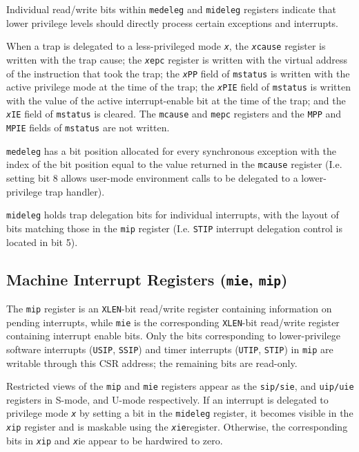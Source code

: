 Individual read/write bits within \texttt{medeleg} and \texttt{mideleg} registers indicate
that lower privilege levels should directly process certain exceptions
and interrupts.

When a trap is delegated to a less-privileged mode \texttt{\emph{x}}, the
\texttt{\emph{x}cause} register is written with the trap cause; the \texttt{\emph{x}epc}
register is written with the virtual address of the instruction that
took the trap; the \texttt{\emph{x}PP} field of \texttt{mstatus} is written with the
active privilege mode at the time of the trap; the \texttt{\emph{x}PIE} field of
\texttt{mstatus} is written with the value of the active interrupt-enable bit at
the time of the trap; and the \texttt{\emph{x}IE} field of \texttt{mstatus} is cleared.
The \texttt{mcause} and \texttt{mepc} registers and the \texttt{MPP} and \texttt{MPIE} fields of \texttt{mstatus} are not written.



\texttt{medeleg} has a bit position allocated for every synchronous exception with the index of the bit position equal to the
value returned in the \texttt{mcause} register (I.e. setting bit 8 allows
user-mode environment calls to be delegated to a lower-privilege trap
handler). 



\texttt{mideleg} holds trap delegation bits for individual interrupts, with the
layout of bits matching those in the \texttt{mip} register (I.e. \texttt{STIP} interrupt
delegation control is located in bit 5).

\subsection{Machine Interrupt Registers (\texttt{mie},
\texttt{mip})}\label{machine-interrupt-registers-mie-mip}

The \texttt{mip} register is an \texttt{XLEN}-bit read/write register containing
information on pending interrupts, while \texttt{mie} is the corresponding
\texttt{XLEN}-bit read/write register containing interrupt enable bits. Only the
bits corresponding to lower-privilege software interrupts (\texttt{USIP}, \texttt{SSIP})
and timer interrupts (\texttt{UTIP}, \texttt{STIP}) in \texttt{mip} are writable through this CSR address; the remaining bits are read-only.

Restricted views of the \texttt{mip} and \texttt{mie} registers appear as the \texttt{sip/sie}, and
\texttt{uip/uie} registers in S-mode, and U-mode respectively. If an interrupt is
delegated to privilege mode \texttt{\emph{x}} by setting a bit in the \texttt{mideleg}
register, it becomes visible in the \texttt{\emph{x}ip} register and is maskable
using the \texttt{\emph{x}ie}register. Otherwise, the corresponding bits in
\texttt{\emph{x}ip} and \texttt{\emph{x}}ie appear to be hardwired to zero.



